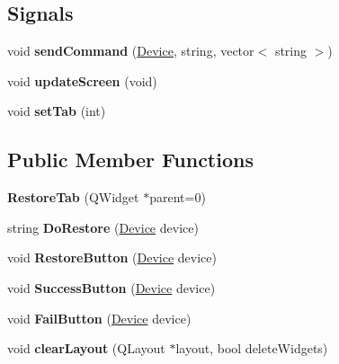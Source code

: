 \subsection*{Signals}
\begin{DoxyCompactItemize}
\item 
\mbox{\label{classRestoreTab_ab4823d1d9bea7a4a5a831aa03a51861b}} 
void {\bfseries send\+Command} (\hyperlink{classDevice}{Device}, string, vector$<$ string $>$)
\item 
\mbox{\label{classRestoreTab_a165346467b7ce01ec33fde98e234e4e5}} 
void {\bfseries update\+Screen} (void)
\item 
\mbox{\label{classRestoreTab_aaef0bb2a23fb3b2c4dc4decd8d4973c5}} 
void {\bfseries set\+Tab} (int)
\end{DoxyCompactItemize}
\subsection*{Public Member Functions}
\begin{DoxyCompactItemize}
\item 
\mbox{\label{classRestoreTab_acda42485891361316db7775e695c4530}} 
{\bfseries Restore\+Tab} (Q\+Widget $\ast$parent=0)
\item 
\mbox{\label{classRestoreTab_aa1bb831ba9b097a7d5f565ab452d34df}} 
string {\bfseries Do\+Restore} (\hyperlink{classDevice}{Device} device)
\item 
\mbox{\label{classRestoreTab_abc2f0056b937d2ea5c9550efc271d72e}} 
void {\bfseries Restore\+Button} (\hyperlink{classDevice}{Device} device)
\item 
\mbox{\label{classRestoreTab_aed26e09af67d9cd7e11bd36ca6b4eecc}} 
void {\bfseries Success\+Button} (\hyperlink{classDevice}{Device} device)
\item 
\mbox{\label{classRestoreTab_a01c85e4378871f74a9fadf1ccf1dc3a9}} 
void {\bfseries Fail\+Button} (\hyperlink{classDevice}{Device} device)
\item 
\mbox{\label{classRestoreTab_af3b0de7700a051ffba65d2a987868858}} 
void {\bfseries clear\+Layout} (Q\+Layout $\ast$layout, bool delete\+Widgets)
\end{DoxyCompactItemize}
